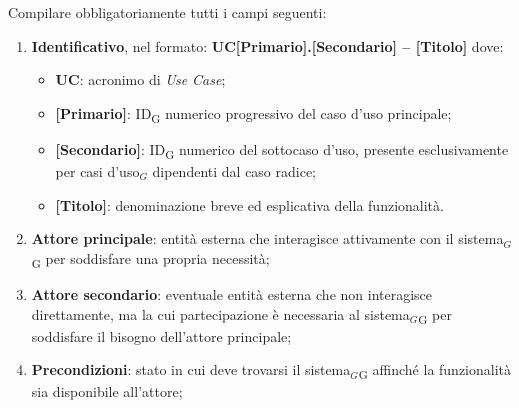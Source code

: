 \documentclass[a4paper, 10pt]{article}
\begin{document}
\noindent Compilare obbligatoriamente tutti i campi seguenti:
\begin{enumerate}
    \item \textbf{Identificativo}, nel formato:
    \noindent\textbf{UC[Primario].[Secondario] -- [Titolo]}
    dove:
    \begin{itemize}
        \item \textbf{UC}: acronimo di \textit{Use Case};
        \item \textbf{[Primario]}: ID\textsubscript{G} numerico progressivo del caso d'uso principale;
        \item \textbf{[Secondario]}: ID\textsubscript{G} numerico del sottocaso d'uso, presente esclusivamente per casi d'uso$_G$ dipendenti dal caso radice;
        \item \textbf{[Titolo]}: denominazione breve ed esplicativa della funzionalità.
    \end{itemize}

    \item \textbf{Attore principale}: entità esterna che interagisce attivamente con il sistema$_G$\textsubscript{G} per soddisfare una propria necessità;

    \item \textbf{Attore secondario}: eventuale entità esterna che non interagisce direttamente, ma la cui partecipazione è necessaria al sistema$_G$\textsubscript{G} per soddisfare il bisogno dell'attore principale;

    \item \textbf{Precondizioni}: stato in cui deve trovarsi il sistema$_G$\textsubscript{G} affinché la funzionalità sia disponibile all'attore;


\end{enumerate}
\end{document}
